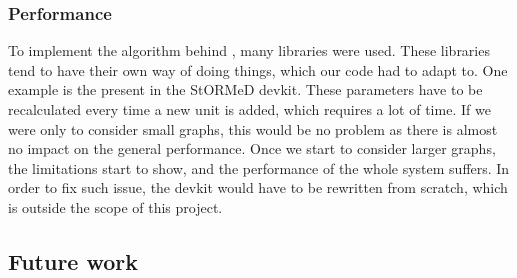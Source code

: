 \subsubsection{Performance}
To implement the algorithm behind \projectName, many libraries were used. These libraries tend to have their own way of doing things, which our code had to adapt to. One example is the  present in the StORMeD devkit. These parameters have to be recalculated every time a new unit is added, which requires a lot of time. If we were only to consider small graphs, this would be no problem as there is almost no impact on the general performance. Once we start to consider larger graphs, the limitations start to show, and the performance of the whole system suffers. In order to fix such issue, the devkit would have to be rewritten from scratch, which is outside the scope of this project. 

\subsection{Future work}